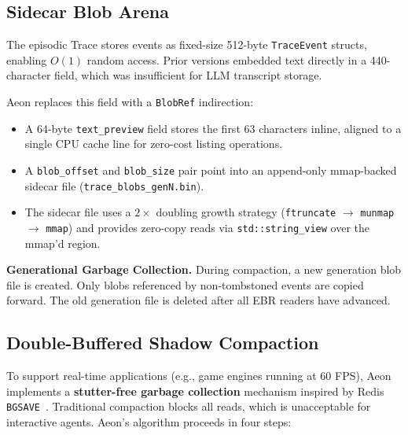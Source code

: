 \documentclass[10pt,twocolumn]{article}
\begin{document}
\subsection{Sidecar Blob Arena}
\label{subsec:blob_arena}
The episodic Trace stores events as fixed-size 512-byte \texttt{TraceEvent} structs, enabling $O(1)$ random access. Prior versions embedded text directly in a 440-character field, which was insufficient for LLM transcript storage.

Aeon replaces this field with a \texttt{BlobRef} indirection:
\begin{itemize}
    \item A 64-byte \texttt{text\_preview} field stores the first 63 characters inline, aligned to a single CPU cache line for zero-cost listing operations.
    \item A \texttt{blob\_offset} and \texttt{blob\_size} pair point into an append-only mmap-backed sidecar file (\texttt{trace\_blobs\_genN.bin}).
    \item The sidecar file uses a $2\times$ doubling growth strategy (\texttt{ftruncate} $\to$ \texttt{munmap} $\to$ \texttt{mmap}) and provides zero-copy reads via \texttt{std::string\_view} over the mmap'd region.
\end{itemize}

\textbf{Generational Garbage Collection.} During compaction, a new generation blob file is created. Only blobs referenced by non-tombstoned events are copied forward. The old generation file is deleted after all EBR readers have advanced.

\subsection{Double-Buffered Shadow Compaction}
\label{subsec:shadow_compaction}
To support real-time applications (e.g., game engines running at 60 FPS), Aeon implements a \textbf{stutter-free garbage collection} mechanism inspired by Redis \texttt{BGSAVE}~\cite{antirez2009redis}. Traditional compaction blocks all reads, which is unacceptable for interactive agents. Aeon's algorithm proceeds in four steps:
\end{document}
